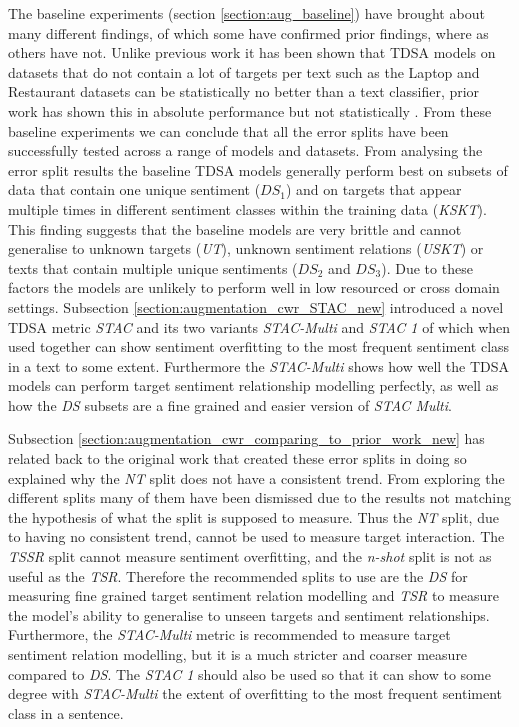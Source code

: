 The baseline experiments (section \ref{section:aug_baseline}) have brought about many different findings, of which some have confirmed prior findings, where as others have not. Unlike previous work it has been shown that TDSA models on datasets that do not contain a lot of targets per text such as the Laptop and Restaurant datasets can be statistically no better than a text classifier, prior work has shown this in absolute performance but not statistically \citep{jiang-etal-2019-challenge}. From these baseline experiments we can conclude that all the error splits have been successfully tested across a range of models and datasets. From analysing the error split results the baseline TDSA models generally perform best on subsets of data that contain one unique sentiment ($DS_1$) and on targets that appear multiple times in different sentiment classes within the training data (\textit{KSKT}). This finding suggests that the baseline models are very brittle and cannot generalise to unknown targets (\textit{UT}), unknown sentiment relations (\textit{USKT}) or texts that contain multiple unique sentiments ($DS_2$ and $DS_3$). Due to these factors the models are unlikely to perform well in low resourced or cross domain settings. Subsection \ref{section:augmentation_cwr_STAC_new} introduced a novel TDSA metric \textit{STAC} and its two variants \textit{STAC-Multi} and \textit{STAC 1} of which when used together can show sentiment overfitting to the most frequent sentiment class in a text to some extent. Furthermore the \textit{STAC-Multi} shows how well the TDSA models can perform target sentiment relationship modelling perfectly, as well as how the \textit{DS} subsets are a fine grained and easier version of \textit{STAC Multi}.

Subsection \ref{section:augmentation_cwr_comparing_to_prior_work_new} has related back to the original work that created these error splits in doing so explained why the \textit{NT} split does not have a consistent trend. From exploring the different splits many of them have been dismissed due to the results not matching the hypothesis of what the split is supposed to measure. Thus the \textit{NT} split, due to having no consistent trend, cannot be used to measure target interaction. The \textit{TSSR} split cannot measure sentiment overfitting, and the \textit{n-shot} split is not as useful as the \textit{TSR}. Therefore the recommended splits to use are the \textit{DS} for measuring fine grained target sentiment relation modelling and \textit{TSR} to measure the model's ability to generalise to unseen targets and sentiment relationships. Furthermore, the \textit{STAC-Multi} metric is recommended to measure target sentiment relation modelling, but it is a much stricter and coarser measure compared to \textit{DS}. The \textit{STAC 1} should also be used so that it can show to some degree with \textit{STAC-Multi} the extent of overfitting to the most frequent sentiment class in a sentence.

